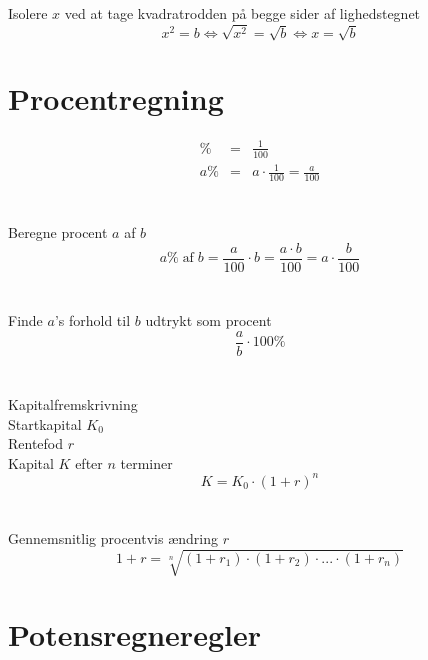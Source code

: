 \documentclass[11pt,a5paper,fleqn,leqno]{book}
\begin{document}
Isolere $x$ ved at tage kvadratrodden på begge sider af lighedstegnet
\begin{equation} \label{eq:ligning_kvadratrod}
x^2 = b \Leftrightarrow \sqrt{x^2} = \sqrt{b} \Leftrightarrow x = \sqrt{b}
\end{equation}

\newpage

\section{Procentregning}

\begin{eqnarray} \label{eq:procent}
\% & = & \frac{1}{100} \\
a\% & = & a \cdot \frac{1}{100} = \frac{a}{100} \nonumber
\end{eqnarray}
\\
\\
Beregne procent $a$ af $b$
\begin{equation} \label{eq:procent_beregne}
a\% \; \text{af} \; b = \frac{a}{100} \cdot b = \frac{a \cdot b}{100} = a \cdot \frac{b}{100}
\end{equation}
\\
\\
Finde $a$'s forhold til $b$ udtrykt som procent
\begin{equation} \label{eq:procent_finde}
\frac{a}{b} \cdot 100\% 
\end{equation}
\\
\\
Kapitalfremskrivning \\
Startkapital $K_0$ \\
Rentefod $r$ \\
Kapital $K$ efter $n$ terminer
\begin{equation} \label{eq:procent_kapital}
K = K_{0} \cdot \left(1+r\right)^{n}
\end{equation}
\\
\\
Gennemsnitlig procentvis ændring $r$
\begin{equation} \label{eq:procent_gennemsnit_aendring}
1+r = \sqrt[n]{\left(1+r_{1}\right) \cdot \left(1+r_{2}\right) \cdot ... \cdot \left(1+r_{n}\right)}
\end{equation} 

\newpage

\section{Potensregneregler}
\end{document}
